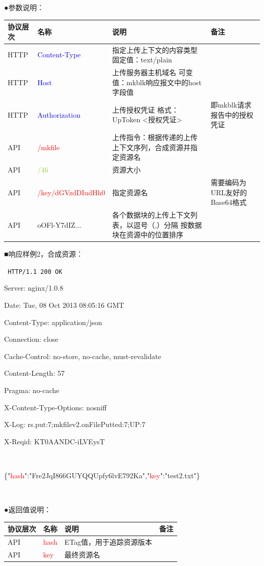 \documentclass[11pt, oneside]{book}
\newcommand{\qblock}[1]{
\vspace{0.1em}
\noindent
#1\par
\vspace{0.1em}
}
\newcommand{\qtable}[1]{\footnotesize\vspace{0.5em}#1\vspace{0.5em}\normalsize}
\newcommand{\qhttp}[1]{\noindent #1\par}
\begin{document}
\qblock{●\thinspace 参数说明：}
\qtable{
\def\arraystretch{2}
\begin{tabular}{|l|p{7em}|p{19em}|p{7em}|}
\hline
协议层次 & 名称 & 说明 & 备注 \\
\hline
HTTP & \textcolor{blue}{Content-Type} & 指定上传上下文的内容类型 \newline 固定值：text/plain & \\
\hline
HTTP & \textcolor{blue}{Host} & 上传服务器主机域名 \newline 可变值：mkblk响应报文中的host字段值 & \\
\hline
HTTP & \textcolor{blue}{Authorization} & 上传授权凭证 \newline 格式：UpToken <授权凭证> & 即mkblk请求报告中的授权凭证 \\
\hline
API & \textcolor{red}{/mkfile} & 上传指令：根据传递的上传上下文序列，合成资源并指定资源名 & \\
\hline
API & \textcolor{YellowGreen}{/46} & 资源大小 & \\
\hline
API & \textcolor{red}{/key/dGVzdDIudHh0} & 指定资源名 & 需要编码为URL友好的Base64格式 \\
\hline
API & \textcolor{YellowOrange}{oOFl-Y7dIZ...} & 各个数据块的上传上下文列表，以逗号（,）分隔 \newline 按数据块在资源中的位置排序 & \\
\hline
\end{tabular}
}

\clearpage 

\qblock{■\thinspace 响应样例2，合成资源：}
{
\tt \footnotesize
\qhttp{HTTP/1.1 200 OK}
\qhttp{Server: nginx/1.0.8}
\qhttp{Date: Tue, 08 Oct 2013 08:05:16 GMT}
\qhttp{Content-Type: application/json}
\qhttp{Connection: close}
\qhttp{Cache-Control: no-store, no-cache, must-revalidate}
\qhttp{Content-Length: 57}
\qhttp{Pragma: no-cache}
\qhttp{X-Content-Type-Options: nosniff}
\qhttp{X-Log: rs.put:7;mkfilev2.onFilePutted:7;UP:7}
\qhttp{X-Reqid: KT0AANDC-iLVEysT}
\qhttp{\ }
\qhttp{\{"\textcolor{red}{hash}":"Fre2JqI866GUYQQUpfy6lvE792Ka","\textcolor{red}{key}":"test2.txt"\}}
\qhttp{\ }
}

\qblock{●\thinspace 返回值说明：}
\qtable{
\def\arraystretch{2}
\begin{tabular}{|l|p{7em}|p{19em}|p{7em}|}
\hline
协议层次 & 名称 & 说明 & 备注 \\
\hline
API & \textcolor{red}{hash} & ETag值，用于追踪资源版本 & \\
\hline
API & \textcolor{red}{key} & 最终资源名 & \\
\hline
\end{tabular}
}
\end{document}
